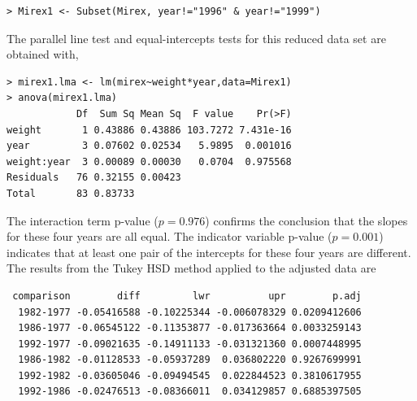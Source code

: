 \documentclass[10pt,openany]{book}\usepackage[]{graphicx}\usepackage[]{color}
\makeatletter
\newenvironment{kframe}{%
 \def\at@end@of@kframe{}%
 \ifinner\ifhmode%
  \def\at@end@of@kframe{\end{minipage}}%
  \begin{minipage}{\columnwidth}%
 \fi\fi%
 \def\FrameCommand##1{\hskip\@totalleftmargin \hskip-\fboxsep
 \colorbox{shadecolor}{##1}\hskip-\fboxsep
     \hskip-\linewidth \hskip-\@totalleftmargin \hskip\columnwidth}%
 \MakeFramed {\advance\hsize-\width
   \@totalleftmargin\z@ \linewidth\hsize
   \@setminipage}}%
 {\par\unskip\endMakeFramed%
 \at@end@of@kframe}
\newenvironment{knitrout}{}{} %
\makeatother
\begin{document}
\begin{knitrout}
\color{fgcolor}\begin{kframe}
\begin{verbatim}
> Mirex1 <- Subset(Mirex, year!="1996" & year!="1999")
\end{verbatim}
\end{kframe}
\end{knitrout}

The parallel line test and equal-intercepts tests for this reduced data set are obtained with,

\begin{knitrout}
\color{fgcolor}\begin{kframe}
\begin{verbatim}
> mirex1.lma <- lm(mirex~weight*year,data=Mirex1)
> anova(mirex1.lma)
            Df  Sum Sq Mean Sq  F value    Pr(>F)
weight       1 0.43886 0.43886 103.7272 7.431e-16
year         3 0.07602 0.02534   5.9895  0.001016
weight:year  3 0.00089 0.00030   0.0704  0.975568
Residuals   76 0.32155 0.00423                   
Total       83 0.83733                           
\end{verbatim}
\end{kframe}
\end{knitrout}

The interaction term p-value ($p=0.976$) confirms the conclusion that the slopes for these four years are all equal.  The indicator variable p-value ($p=0.001$) indicates that at least one pair of the intercepts for these four years are different.  The results from the Tukey HSD method applied to the adjusted data are

\begin{knitrout}
\color{fgcolor}\begin{kframe}
\begin{verbatim}
 comparison        diff         lwr          upr        p.adj
  1982-1977 -0.05416588 -0.10225344 -0.006078329 0.0209412606
  1986-1977 -0.06545122 -0.11353877 -0.017363664 0.0033259143
  1992-1977 -0.09021635 -0.14911133 -0.031321360 0.0007448995
  1986-1982 -0.01128533 -0.05937289  0.036802220 0.9267699991
  1992-1982 -0.03605046 -0.09494545  0.022844523 0.3810617955
  1992-1986 -0.02476513 -0.08366011  0.034129857 0.6885397505
\end{verbatim}
\end{kframe}
\end{knitrout}
\end{document}
